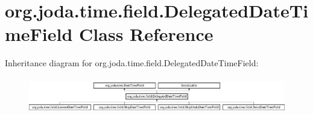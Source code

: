 \hypertarget{classorg_1_1joda_1_1time_1_1field_1_1_delegated_date_time_field}{\section{org.\-joda.\-time.\-field.\-Delegated\-Date\-Time\-Field Class Reference}
\label{classorg_1_1joda_1_1time_1_1field_1_1_delegated_date_time_field}
}
Inheritance diagram for org.\-joda.\-time.\-field.\-Delegated\-Date\-Time\-Field\-:\begin{figure}[H]
\begin{center}
\leavevmode
\includegraphics[height=1.603053cm]{classorg_1_1joda_1_1time_1_1field_1_1_delegated_date_time_field}
\end{center}
\end{figure}
